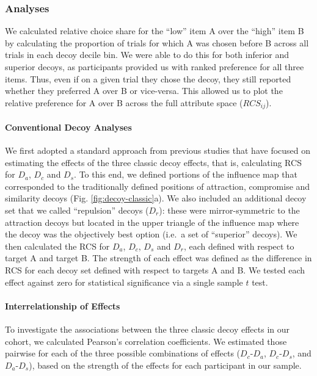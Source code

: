 \documentclass[a4paper, nobind]{templates/ociamthesis}
\begin{document}
\hypertarget{analyses}{%
\subsubsection{Analyses}\label{analyses}}

We calculated relative choice share for the ``low'' item A over the ``high'' item B by calculating the proportion of trials for which A was chosen before B across all trials in each decoy decile bin. We were able to do this for both inferior and superior decoys, as participants provided us with ranked preference for all three items. Thus, even if on a given trial they chose the decoy, they still reported whether they preferred A over B or vice-versa. This allowed us to plot the relative preference for A over B across the full attribute space (\(RCS_{ij}\)).

\hypertarget{conventional-decoy-analyses}{%
\paragraph{Conventional Decoy Analyses}\label{conventional-decoy-analyses}}

We first adopted a standard approach from previous studies that have focused on estimating the effects of the three classic decoy effects, that is, calculating RCS for \(D_a\), \(D_c\) and \(D_s\). To this end, we defined portions of the influence map that corresponded to the traditionally defined positions of attraction, compromise and similarity decoys (Fig. \ref{fig:decoy-classic}a). We also included an additional decoy set that we called ``repulsion'' decoys (\(D_r\)): these were mirror-symmetric to the attraction decoys but located in the upper triangle of the influence map where the decoy was the objectively best option (i.e.~a set of ``superior'' decoys). We then calculated the RCS for \(D_a\), \(D_c\), \(D_s\) and \(D_r\), each defined with respect to target A and target B. The strength of each effect was defined as the difference in RCS for each decoy set defined with respect to targets A and B. We tested each effect against zero for statistical significance via a single sample \(t\) test.

\hypertarget{interrelationship-of-effects}{%
\paragraph{Interrelationship of Effects}\label{interrelationship-of-effects}}

To investigate the associations between the three classic decoy effects in our cohort, we calculated Pearson's correlation coefficients. We estimated those pairwise for each of the three possible combinations of effects (\(D_c\)-\(D_a\), \(D_c\)-\(D_s\), and \(D_a\)-\(D_s\)), based on the strength of the effects for each participant in our sample.
\end{document}
